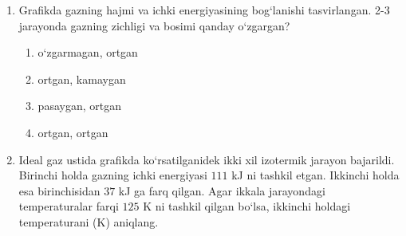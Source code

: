 \begin{enumerate}

\begin{enumerate}[label=\Alph*)]
\item $\Delta U_a > \Delta U_b > \Delta U_c$
\item $\Delta U_a < \Delta U_b < \Delta U_c$
\item $\Delta U_a = \Delta U_b = \Delta U_c$
\item $\Delta U_a = \Delta U_b = \Delta U_c = 0$

\end{enumerate}

\item Grafikda gazning hajmi va ichki energiyasining bog‘lanishi tasvirlangan. 2-3 jarayonda gazning zichligi va bosimi qanday o‘zgargan?


\begin{enumerate}[label=\Alph*)]
\item o‘zgarmagan, ortgan
\item ortgan, kamaygan
\item pasaygan, ortgan
\item ortgan, ortgan

\end{enumerate}

\item Ideal gaz ustida grafikda ko‘rsatilganidek ikki xil izotermik jarayon bajarildi. Birinchi holda gazning ichki energiyasi $111$ kJ ni tashkil etgan. Ikkinchi holda esa birinchisidan $37$ kJ ga farq qilgan. Agar ikkala jarayondagi temperaturalar farqi $125$ K ni tashkil qilgan bo‘lsa, ikkinchi holdagi temperaturani (K) aniqlang.


\end{enumerate}
